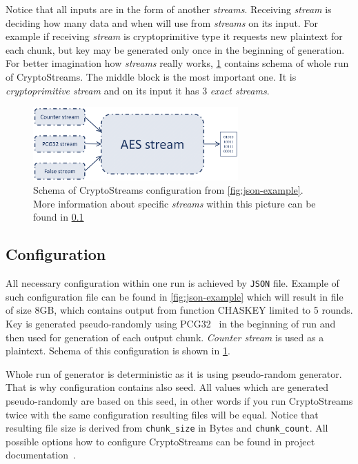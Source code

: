 \documentclass[
    digital,    %
    oneside,    %
    color,
    11pt,
    nocover,
    notable,
    nolof,
    nolot,
    final
]{fithesis3}
\begin{document}
Notice that all inputs are in the form of another \textit{streams}. Receiving \textit{stream} is deciding how many data and when will use from \textit{streams} on its input. For example if receiving \textit{stream} is cryptoprimitive type it requests new plaintext for each chunk, but key may be generated only once in the beginning of generation. For better imagination how \textit{streams} really works, \cref{fig:config-schema} contains schema of whole run of CryptoStreams. The middle block is the most important one. It is \textit{cryptoprimitive stream} and on its input it has 3 \textit{exact streams}.

\begin{figure}[h]
	\centering
	\includegraphics[width=0.7\textwidth]{./images/pictures/config-schema.png}
	\caption{Schema of CryptoStreams configuration from \cref{fig:json-example}. More information about specific \textit{streams} within this picture can be found in \cref{subsec:configuration} }
	\label{fig:config-schema}
\end{figure}


\subsection{Configuration}
\label{subsec:configuration}

All necessary configuration within one run is achieved by \texttt{JSON} file. Example of such configuration file can be found in \cref{fig:json-example} which will result in file of size 8GB, which contains output from function CHASKEY limited to 5 rounds. Key is generated pseudo-randomly using PCG32~\cite{pcgGen} in the beginning of run and then used for generation of each output chunk. \textit{Counter stream} is used as a plaintext. Schema of this configuration is shown in \cref{fig:config-schema}. 

Whole run of generator is deterministic as it is using pseudo-random generator. That is why configuration contains also seed. All values which are generated pseudo-randomly are based on this seed, in other words if you run CryptoStreams twice with the same configuration resulting files will be equal. Notice that resulting file size is derived from \texttt{chunk\_size} in Bytes and \texttt{chunk\_count}. All possible options how to configure CryptoStreams can be found in project documentation~\cite{CryptoStreams-wiki}.
\end{document}
